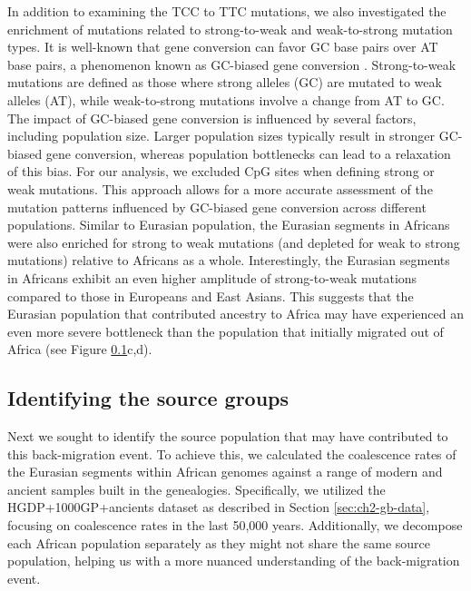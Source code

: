 In addition to examining the TCC to TTC mutations, we also investigated the enrichment of mutations related to strong-to-weak and weak-to-strong mutation types. It is well-known that gene conversion can favor GC base pairs over AT base pairs, a phenomenon known as GC-biased gene conversion \cite{duret2009biased}. Strong-to-weak mutations are defined as those where strong alleles (GC) are mutated to weak alleles (AT), while weak-to-strong mutations involve a change from AT to GC. The impact of GC-biased gene conversion is influenced by several factors, including population size. Larger population sizes typically result in stronger GC-biased gene conversion, whereas population bottlenecks can lead to a relaxation of this bias. For our analysis, we excluded CpG sites when defining strong or weak mutations. This approach allows for a more accurate assessment of the mutation patterns influenced by GC-biased gene conversion across different populations. Similar to Eurasian population, the Eurasian segments in Africans were also enriched for strong to weak mutations (and depleted for weak to strong mutations) relative to Africans as a whole. Interestingly, the Eurasian segments in Africans exhibit an even higher amplitude of strong-to-weak mutations compared to those in Europeans and East Asians. This suggests that the Eurasian population that contributed ancestry to Africa may have experienced an even more severe bottleneck than the population that initially migrated out of Africa (see Figure \ref{}c,d). 

\subsection{Identifying the source groups}

Next we sought to identify the source population that may have contributed to this back-migration event. To achieve this, we calculated the coalescence rates of the Eurasian segments within African genomes against a range of modern and ancient samples built in the genealogies. Specifically, we utilized the HGDP+1000GP+ancients dataset as described in Section \ref{sec:ch2-gb-data}, focusing on coalescence rates in the last 50,000 years. Additionally, we decompose each African population separately as they might not share the same source population, helping us with a more nuanced understanding of the back-migration event.


